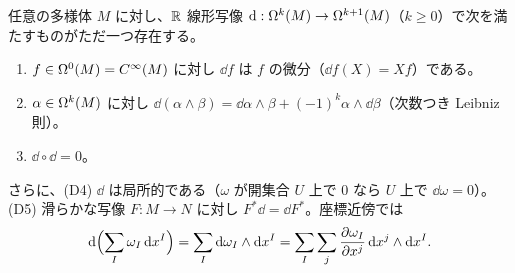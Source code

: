 \begin{thm}[外微分の存在と一意性]\label{B:thm:d}\tP
任意の多様体 $M$ に対し、$\mathbb R$ 線形写像 $\mathrm{d}:\Omega^k(M)\to\Omega^{k+1}(M)$（$k\ge0$）で次を満たすものがただ一つ存在する。
\begin{enumerate}[label=(D\arabic*)]
\item $f\in\Omega^0(M)=C^\infty(M)$ に対し $\dd f$ は $f$ の微分（$\dd f(X)=Xf$）である。
\item $\alpha\in\Omega^k(M)$ に対し $\dd(\alpha\wedge\beta)=\dd\alpha\wedge\beta+(-1)^k\alpha\wedge\dd\beta$（次数つき Leibniz 則）。
\item $\dd\circ\dd=0$。
\end{enumerate}
さらに、(D4) $\dd$ は局所的である（$\omega$ が開集合 $U$ 上で $0$ なら $U$ 上で $\dd\omega=0$）。(D5) 滑らかな写像 $F:M\to N$ に対し $F^*\dd=\dd F^*$。座標近傍では
\begin{equation}\label{B:eq:dcoord}
\mathrm{d}\Bigl(\sum_I\omega_I\,\mathrm{d} x^I\Bigr)=\sum_I\mathrm{d}\omega_I\wedge\mathrm{d} x^I=\sum_I\sum_j\frac{\partial\omega_I}{\partial x^j}\,\mathrm{d} x^j\wedge\mathrm{d} x^I .
\end{equation}
\end{thm}
